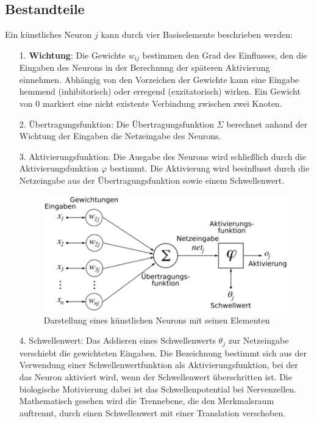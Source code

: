 \subsection{Bestandteile}
Ein künstliches Neuron ${\displaystyle j}$ kann durch vier Basiselemente beschrieben werden:
\begin{itemize}
\item[1.] \textbf{Wichtung}: Die Gewichte ${\displaystyle w_{ij}}$ bestimmen den Grad des Einflusses, den die Eingaben des Neurons in der Berechnung der späteren Aktivierung einnehmen. Abhängig von den Vorzeichen der Gewichte kann eine Eingabe hemmend (inhibitorisch) oder erregend (exzitatorisch) wirken. Ein Gewicht von 0 markiert eine nicht existente Verbindung zwischen zwei Knoten.
\item[2.] Übertragungsfunktion: Die Übertragungsfunktion ${\displaystyle \Sigma }$ berechnet anhand der Wichtung der Eingaben die Netzeingabe des Neurons.
\item[3.] Aktivierungsfunktion: Die Ausgabe des Neurons wird schließlich durch die Aktivierungsfunktion ${\displaystyle \varphi }$ bestimmt. Die Aktivierung wird beeinflusst durch die Netzeingabe aus der Übertragungsfunktion sowie einem Schwellenwert.
\begin{figure}[h]
\centering
\includegraphics[width=0.7\linewidth]{pics/kneuron.png}
\caption[künstliches Neuron]{Darstellung eines künstlichen Neurons mit seinen Elementen}
\label{fig:kneuron}
\end{figure}
\item[4.] Schwellenwert: Das Addieren eines Schwellenwerts ${\displaystyle \theta _{j}}$ zur Netzeingabe verschiebt die gewichteten Eingaben. Die Bezeichnung bestimmt sich aus der Verwendung einer Schwellenwertfunktion als Aktivierungsfunktion, bei der das Neuron aktiviert wird, wenn der Schwellenwert überschritten ist. Die biologische Motivierung dabei ist das Schwellenpotential bei Nervenzellen. Mathematisch gesehen wird die Trennebene, die den Merkmalsraum auftrennt, durch einen Schwellenwert mit einer Translation verschoben.
\end{itemize}

